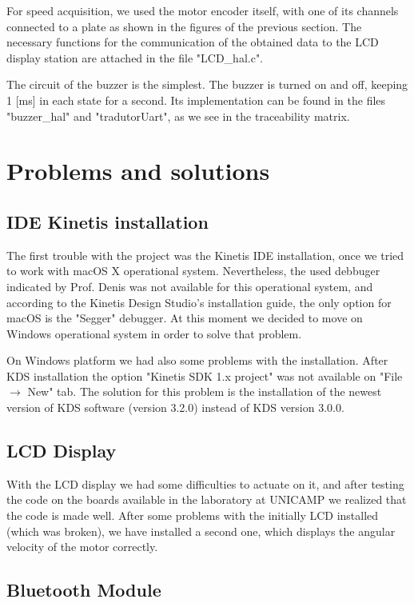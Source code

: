 \documentclass[journal]{IEEEtran}
\begin{document}
For speed acquisition, we used the motor encoder itself, with one of its channels connected to a plate as shown in the figures of the previous section.
The necessary functions for the communication of the obtained data to the LCD display station are attached in the file "LCD\_hal.c".

The circuit of the buzzer is the simplest. The buzzer is turned on and off, keeping 1 [ms] in each state for a second. Its implementation can be found in the files "buzzer\_hal" and "tradutorUart", as we see in the traceability matrix.

\section{Problems and solutions}

\subsection{IDE Kinetis installation}

The first trouble with the project was the Kinetis IDE installation, once we tried to work with macOS X operational system. Nevertheless, the used debbuger indicated by Prof. Denis was not available for this operational system, and according to the Kinetis Design Studio's installation guide, the only option for macOS is the "Segger" debugger. At this moment we decided to move on Windows operational system in order to solve that problem.

On Windows platform we had also some problems with the installation. After KDS installation the option "Kinetis SDK 1.x project" was not available on "File $\rightarrow$ New" tab. The solution for this problem is the installation of the newest version of KDS software (version 3.2.0) instead of KDS version 3.0.0.

\subsection{LCD Display}

With the LCD display we had some difficulties to actuate on it, and after testing the code on the boards available in the laboratory at UNICAMP we realized that the code is made well. After some problems with the initially LCD installed (which was broken), we have installed a second one, which displays the angular velocity of the motor correctly.

\subsection{Bluetooth Module}
\end{document}
